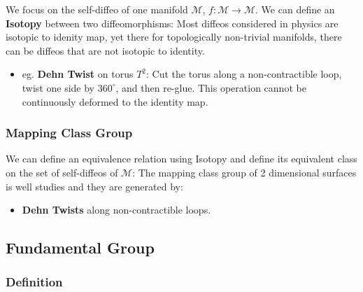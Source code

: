 We focus on the self-diffeo of one manifold $ \mathcal{M} $, $ f:
\mathcal{M} \to \mathcal{M} $. We can define an \textbf{Isotopy}
between two diffeomorphisms:
Most diffeos considered in physics are isotopic to idenity map, yet
there for topologically non-trivial manifolds, there can be diffeos
that are not isotopic to identity.
\begin{itemize}
  \item eg. \textbf{Dehn Twist} on torus \(T^2\): Cut the torus along
    a non-contractible loop, twist one side by \(360^\circ\), and
    then re-glue. This operation cannot be continuously deformed to
    the identity map.
\end{itemize}

\subsubsection{Mapping Class Group}

We can define an equivalence relation using Isotopy and define its
equivalent class on the set of self-diffeos of \( \mathcal{M} \):
The mapping class group of 2 dimensional surfaces is well studies and
they are generated by:
\begin{itemize}
  \item \textbf{Dehn Twists} along non-contractible loops.
\end{itemize}

\subsection{Fundamental Group}
\subsubsection{Definition}

